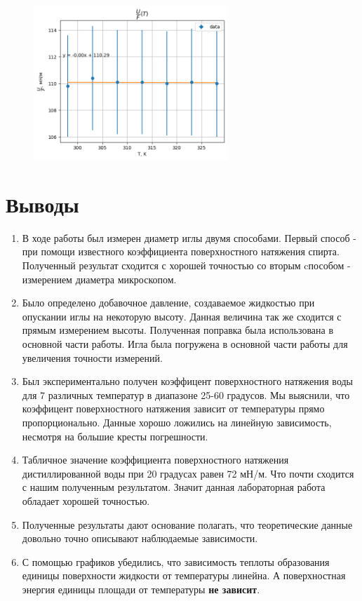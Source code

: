 \documentclass[a4paper,12pt]{article}
\begin{document}
\begin{figure}[H]
    \begin{center}
    \includegraphics[width=0.65\textwidth]{U:F.png}
    \end{center}
\end{figure}

\section{Выводы}

\begin{enumerate}
    \item В ходе работы был измерен диаметр иглы двумя способами. Первый способ - при помощи известного коэффициента поверхностного натяжения спирта. Полученный результат сходится с хорошей точностью со вторым cпособом - измерением диаметра микроскопом.
    \item Было определено добавочное давление, создаваемое жидкостью при опускании иглы на некоторую высоту. Данная величина так же сходится с прямым измерением высоты. Полученная поправка была использована в основной части работы. Игла была погружена в основной части работы для увеличения точности измерений.
    \item Был экспериментально получен коэффицент поверхностного натяжения воды для 7 различных температур в диапазоне 25-60 градусов. Мы выяснили, что коэффицент поверхностного натяжения зависит от температуры прямо пропорционально. Данные хорошо ложились на линейную зависимость, несмотря на большие кресты погрешности. 
    \item Табличное значение коэффициента поверхностного натяжения дистиллированной воды при 20 градусах равен 72 мН/м. Что почти сходится с нашим полученным результатом. Значит данная лабораторная работа обладает хорошей точностью. 
    \item Полученные результаты дают основание полагать, что теоретические данные довольно точно описывают наблюдаемые зависимости. 
    \item С помощью графиков убедились, что зависимость теплоты образования единицы поверхности жидкости от температуры линейна. А поверхностная энергия единицы площади от температуры \textbf{не зависит}. 

\end{enumerate}
\end{document}
